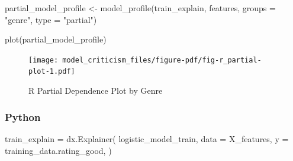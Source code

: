 \documentclass[
  letterpaper,
]{krantz}
\newenvironment{Shaded}{}{}
\newcommand{\AttributeTok}[1]{\textcolor[rgb]{0.49,0.56,0.16}{#1}}
\newcommand{\FunctionTok}[1]{\textcolor[rgb]{0.02,0.16,0.49}{#1}}
\newcommand{\NormalTok}[1]{#1}
\newcommand{\OperatorTok}[1]{\textcolor[rgb]{0.40,0.40,0.40}{#1}}
\newcommand{\OtherTok}[1]{\textcolor[rgb]{0.00,0.44,0.13}{#1}}
\newcommand{\StringTok}[1]{\textcolor[rgb]{0.25,0.44,0.63}{#1}}
\begin{document}
\begin{Shaded}
\begin{Highlighting}[]
\NormalTok{partial\_model\_profile }\OtherTok{\textless{}{-}} \FunctionTok{model\_profile}\NormalTok{(train\_explain, }
\NormalTok{                                  features, }
                                  \AttributeTok{groups =} \StringTok{"genre"}\NormalTok{,}
                                  \AttributeTok{type =} \StringTok{"partial"}\NormalTok{)}
\end{Highlighting}
\end{Shaded}

\begin{Shaded}
\begin{Highlighting}[]
\FunctionTok{plot}\NormalTok{(partial\_model\_profile)}
\end{Highlighting}
\end{Shaded}

\begin{figure}[H]

{\centering \texttt{[image: model\_criticism\_files/figure-pdf/fig-r\_partial-plot-1.pdf]}

}

\caption{\label{fig-r_partial-plot}R Partial Dependence Plot by Genre}

\end{figure}

\subsubsection{Python}

\begin{Shaded}
\begin{Highlighting}[]
\NormalTok{train\_explain }\OperatorTok{=}\NormalTok{ dx.Explainer(}
\NormalTok{    logistic\_model\_train, }
\NormalTok{    data }\OperatorTok{=}\NormalTok{ X\_features, }
\NormalTok{    y }\OperatorTok{=}\NormalTok{ training\_data.rating\_good, }
\NormalTok{)}
\end{Highlighting}
\end{Shaded}
\end{document}
